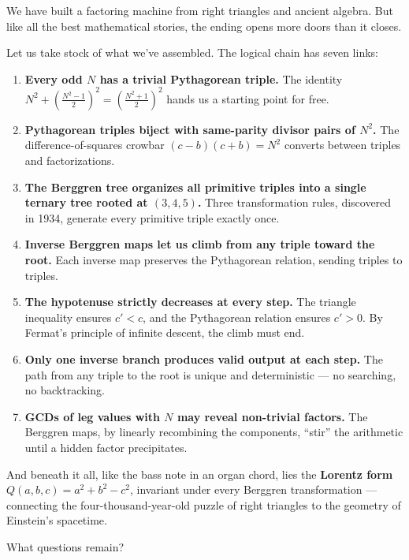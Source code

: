 We have built a factoring machine from right triangles and ancient algebra. But like all the best mathematical stories, the ending opens more doors than it closes.

Let us take stock of what we've assembled. The logical chain has seven links:

\begin{enumerate}
\def\labelenumi{\arabic{enumi}.}
\item
  \textbf{Every odd \(N\) has a trivial Pythagorean triple.} The identity \(N^2 + \left(\frac{N^2-1}{2}\right)^2 = \left(\frac{N^2+1}{2}\right)^2\) hands us a starting point for free.
\item
  \textbf{Pythagorean triples biject with same-parity divisor pairs of \(N^2\).} The difference-of-squares crowbar \((c-b)(c+b) = N^2\) converts between triples and factorizations.
\item
  \textbf{The Berggren tree organizes all primitive triples into a single ternary tree rooted at \((3,4,5)\).} Three transformation rules, discovered in 1934, generate every primitive triple exactly once.
\item
  \textbf{Inverse Berggren maps let us climb from any triple toward the root.} Each inverse map preserves the Pythagorean relation, sending triples to triples.
\item
  \textbf{The hypotenuse strictly decreases at every step.} The triangle inequality ensures \(c' < c\), and the Pythagorean relation ensures \(c' > 0\). By Fermat's principle of infinite descent, the climb must end.
\item
  \textbf{Only one inverse branch produces valid output at each step.} The path from any triple to the root is unique and deterministic --- no searching, no backtracking.
\item
  \textbf{GCDs of leg values with \(N\) may reveal non-trivial factors.} The Berggren maps, by linearly recombining the components, ``stir'' the arithmetic until a hidden factor precipitates.
\end{enumerate}

And beneath it all, like the bass note in an organ chord, lies the \textbf{Lorentz form} \(Q(a,b,c) = a^2 + b^2 - c^2\), invariant under every Berggren transformation --- connecting the four-thousand-year-old puzzle of right triangles to the geometry of Einstein's spacetime.

What questions remain?

